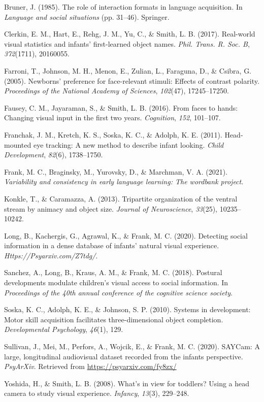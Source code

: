 \documentclass[10pt, letterpaper]{article}
\begin{document}
\hypertarget{refs}{}
\leavevmode\hypertarget{ref-bruner1985role}{}%
Bruner, J. (1985). The role of interaction formats in language
acquisition. In \emph{Language and social situations} (pp. 31--46).
Springer.

\leavevmode\hypertarget{ref-clerkin2017}{}%
Clerkin, E. M., Hart, E., Rehg, J. M., Yu, C., \& Smith, L. B. (2017).
Real-world visual statistics and infants' first-learned object names.
\emph{Phil. Trans. R. Soc. B}, \emph{372}(1711), 20160055.

\leavevmode\hypertarget{ref-farroni2005newborns}{}%
Farroni, T., Johnson, M. H., Menon, E., Zulian, L., Faraguna, D., \&
Csibra, G. (2005). Newborns' preference for face-relevant stimuli:
Effects of contrast polarity. \emph{Proceedings of the National Academy
of Sciences}, \emph{102}(47), 17245--17250.

\leavevmode\hypertarget{ref-fausey2016}{}%
Fausey, C. M., Jayaraman, S., \& Smith, L. B. (2016). From faces to
hands: Changing visual input in the first two years. \emph{Cognition},
\emph{152}, 101--107.

\leavevmode\hypertarget{ref-franchak2011}{}%
Franchak, J. M., Kretch, K. S., Soska, K. C., \& Adolph, K. E. (2011).
Head-mounted eye tracking: A new method to describe infant looking.
\emph{Child Development}, \emph{82}(6), 1738--1750.

\leavevmode\hypertarget{ref-frank2021}{}%
Frank, M. C., Braginsky, M., Yurovsky, D., \& Marchman, V. A. (2021).
\emph{Variability and consistency in early language learning: The
wordbank project}.

\leavevmode\hypertarget{ref-konkle2013tripartite}{}%
Konkle, T., \& Caramazza, A. (2013). Tripartite organization of the
ventral stream by animacy and object size. \emph{Journal of
Neuroscience}, \emph{33}(25), 10235--10242.

\leavevmode\hypertarget{ref-long2020}{}%
Long, B., Kachergis, G., Agrawal, K., \& Frank, M. C. (2020). Detecting
social information in a dense database of infants' natural visual
experience. \emph{Https://Psyarxiv.com/Z7tdg/}.

\leavevmode\hypertarget{ref-sanchez2018postural}{}%
Sanchez, A., Long, B., Kraus, A. M., \& Frank, M. C. (2018). Postural
developments modulate children's visual access to social information. In
\emph{Proceedings of the 40th annual conference of the cognitive science
society}.

\leavevmode\hypertarget{ref-soska2010systems}{}%
Soska, K. C., Adolph, K. E., \& Johnson, S. P. (2010). Systems in
development: Motor skill acquisition facilitates three-dimensional
object completion. \emph{Developmental Psychology}, \emph{46}(1), 129.

\leavevmode\hypertarget{ref-SAYcam}{}%
Sullivan, J., Mei, M., Perfors, A., Wojcik, E., \& Frank, M. C. (2020).
SAYCam: A large, longitudinal audiovisual dataset recorded from the
infants perspective. \emph{PsyArXiv}. Retrieved from
\url{https://psyarxiv.com/fy8zx/}

\leavevmode\hypertarget{ref-yoshida2008}{}%
Yoshida, H., \& Smith, L. B. (2008). What's in view for toddlers? Using
a head camera to study visual experience. \emph{Infancy}, \emph{13}(3),
229--248.


\end{document}
